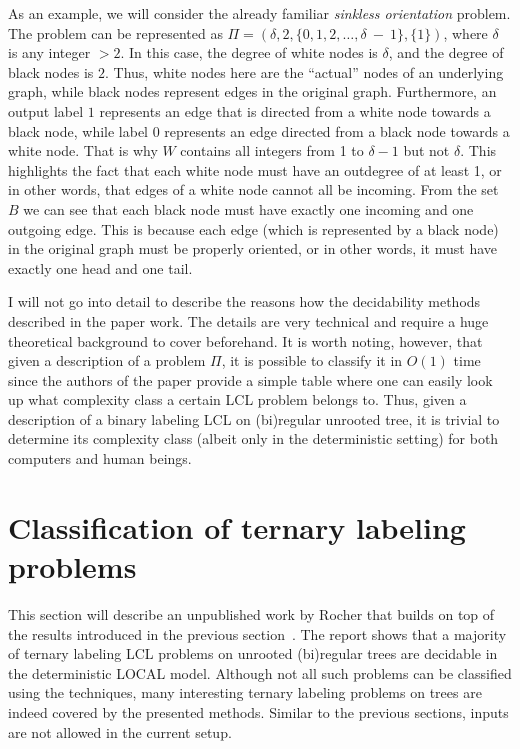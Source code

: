As an example, we will consider the already familiar \emph{sinkless orientation}
problem. The problem can be represented as $\Pi = (\delta, 2, \{0, 1, 2, \dots, \delta~-~1\}, \{ 1 \})$,
where $\delta$ is any integer $> 2$. In this case, the degree of white nodes is
$\delta$, and the degree of black nodes is $2$. Thus, white nodes here are the ``actual''
nodes of an underlying graph, while black nodes represent edges in the original graph.
Furthermore, an output label $1$ represents an edge
that is directed from a white node towards a black node, while label $0$ represents
an edge directed from a black node towards a white node. That is why
$W$ contains all integers from 1 to $\delta - 1$ but not $\delta$.
This highlights the fact that each white node must have an outdegree of at least 1,
or in other words, that edges of a white node cannot all be incoming.
From the set $B$ we can see that each black node must have 
exactly one incoming and one outgoing edge. This is because each edge (which is represented by a black node)
in the original graph must be properly oriented, or in other words, it must
have exactly one head and one tail.

I will not go into detail to describe the reasons how the decidability methods
described in the paper work. The details are very technical and require a huge
theoretical background to cover beforehand. It is worth noting, however, that
given a description of a problem $\Pi$, it is possible to classify it in $O(1)$
time since the authors of the paper provide a simple table where one can
easily look up what complexity class a certain LCL problem belongs to. Thus,
given a description of a binary labeling LCL on (bi)regular unrooted tree,
it is trivial to determine its complexity class (albeit only in the deterministic setting)
for both computers and human beings.

\section{Classification of ternary labeling\\problems}

This section will describe an unpublished work by Rocher that builds on top
of the results introduced in the previous section~\cite{Rocher2020doc, Rocher2020clas}.
The report shows that a majority of ternary labeling LCL problems on unrooted
(bi)regular trees are decidable in the deterministic LOCAL model. Although not all such problems
can be classified using the techniques, many interesting ternary labeling problems on trees
are indeed covered by the presented methods.
Similar to the previous sections, inputs are not allowed in the current setup.

